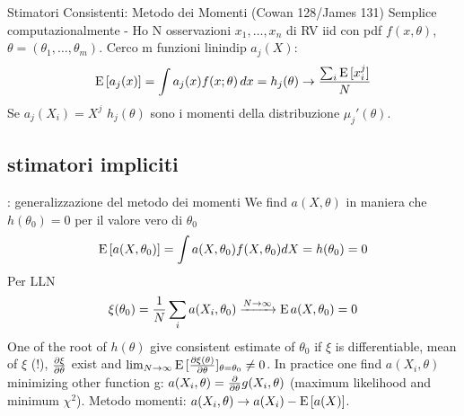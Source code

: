 \documentclass[asd-beamer.tex]{subfiles}%
\begin{document}
\begin{frame}{Stimatori Consistenti: Metodo dei Momenti (Cowan 128/James 131)}\frameintoc
Semplice computazionalmente - Ho N osservazioni $x_1,\ldots,x_n$ di RV iid con pdf $f(x,\theta)$, $\theta=(\theta_1,\ldots,\theta_m)$. Cerco m funzioni linindip $a_j(X)$:
\[\operatorname{E}{[a_j(x)]}=\int a_j(x)f(x;\theta)\,dx=h_j(\theta)\to\frac{\sum_i\operatorname{E}{[x_i^j]}}{N}\]
Se $a_j(X_i)=X^j$ $h_j(\theta)$ sono i momenti della distribuzione $\mu_j'(\theta)$.
\end{frame}

\subsection{stimatori impliciti}

\begin{frame}{: generalizzazione del metodo dei momenti}
We find $a(X,\theta)$ in maniera che $h(\theta_0)=0$ per il valore vero di $\theta_0$
\[\operatorname{E}{[a(X,\theta_0)]}=\int a(X,\theta_0)f(X,\theta_0)dX=h(\theta_0)=0\]
Per LLN \[\xi(\theta_0)=\frac{1}{N}\sum_ia(X_i,\theta_0)\xrightarrow{N\to\infty}\operatorname{E}{a(X,\theta_0)}=0\]
One of the root of $h(\theta)$ give consistent estimate of $\theta_0$ if $\xi$ is differentiable, mean of $\xi$ (!), $\frac{\partial \xi}{\partial \theta}$ exist and $\lim_{N\to\infty}\operatorname{E}{[\frac{\partial \xi(\theta)}{\partial \theta}]_{\theta=\theta_0}}\neq0$.
In practice one find $a(X_i,\theta)$ minimizing other function g: $a(X_i,\theta)=\frac{\partial}{\partial \theta}g(X_i,\theta)$ (maximum likelihood and minimum $\chi^2$).
Metodo momenti: $a(X_i,\theta)\to a(X_i)-\operatorname{E}{[a(X)]}$.
\end{frame}
\end{document}
